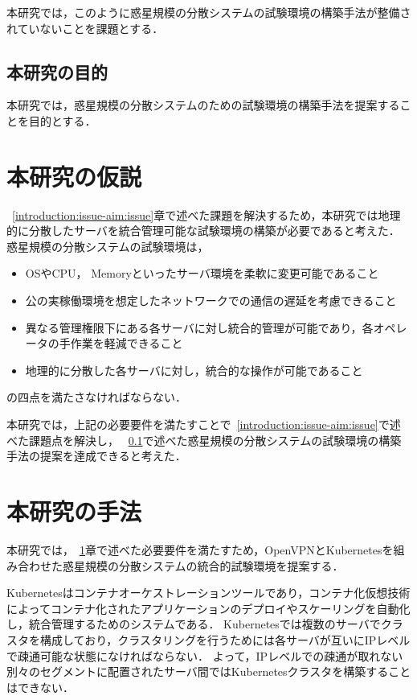 本研究では，このように惑星規模の分散システムの試験環境の構築手法が整備されていないことを課題とする．

\subsection{本研究の目的}
\label{introduction:issue-aim:aim}

本研究では，惑星規模の分散システムのための試験環境の構築手法を提案することを目的とする．

\section{本研究の仮説}
\label{introduction:hypothesis}

~\ref{introduction:issue-aim:issue}章で述べた課題を解決するため，本研究では地理的に分散したサーバを統合管理可能な試験環境の構築が必要であると考えた．
惑星規模の分散システムの試験環境は，
\begin{itemize}
  \item OSやCPU， Memoryといったサーバ環境を柔軟に変更可能であること
  \item 公の実稼働環境を想定したネットワークでの通信の遅延を考慮できること
  \item 異なる管理権限下にある各サーバに対し統合的管理が可能であり，各オペレータの手作業を軽減できること
  \item 地理的に分散した各サーバに対し，統合的な操作が可能であること
\end{itemize}
の四点を満たさなければならない．

本研究では，上記の必要要件を満たすことで~\ref{introduction:issue-aim:issue}で述べた課題点を解決し，
~\ref{introduction:issue-aim:aim}で述べた惑星規模の分散システムの試験環境の構築手法の提案を達成できると考えた．

\section{本研究の手法}
\label{introduction:proposal}

本研究では，~\ref{introduction:hypothesis}章で述べた必要要件を満たすため，OpenVPNとKubernetesを組み合わせた惑星規模の分散システムの統合的試験環境を提案する．

Kubernetesはコンテナオーケストレーションツールであり，コンテナ化仮想技術によってコンテナ化されたアプリケーションのデプロイやスケーリングを自動化し，統合管理するためのシステムである．
Kubernetesでは複数のサーバでクラスタを構成しており，クラスタリングを行うためには各サーバが互いにIPレベルで疎通可能な状態になければならない．
よって，IPレベルでの疎通が取れない別々のセグメントに配置されたサーバ間ではKubernetesクラスタを構築することはできない．


